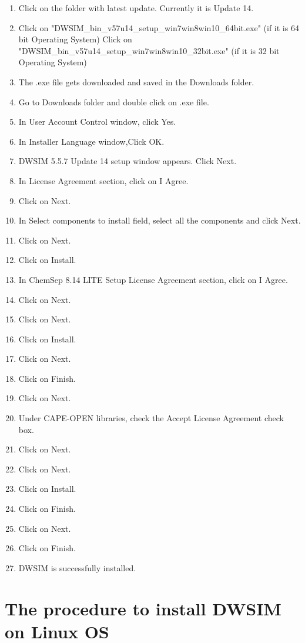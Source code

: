 \documentclass[12pt,a4paper]{article}
\begin{document}
\begin{enumerate}
\item Click on the folder with latest update. Currently it is Update 14.
\item Click on "DWSIM\_bin\_v57u14\_setup\_win7win8win10\_64bit.exe" (if it is 64 bit Operating System)
\newline Click on "DWSIM\_bin\_v57u14\_setup\_win7win8win10\_32bit.exe" (if it is 32 bit Operating System)
\item The .exe file gets downloaded and saved in the Downloads folder.
\item Go to Downloads folder and double click on .exe file.
\item In User Account Control window, click Yes.
\item In Installer Language window,Click OK.
\item DWSIM 5.5.7 Update 14 setup window appears. Click Next.
\item In License Agreement section, click on I Agree.
\item Click on Next.
\item In Select components to install field, select all the components and click Next.
\item Click on Next.
\item Click on Install.
\item In ChemSep 8.14 LITE Setup License Agreement section, click on I Agree.
\item Click on Next.
\item Click on Next.
\item Click on Install.
\item Click on Next.
\item Click on Finish.
\item Click on Next.
\item Under CAPE-OPEN libraries, check the Accept License Agreement check box.
\item Click on Next.
\item Click on Next.
\item Click on Install.
\item Click on Finish.
\item Click on Next.
\item Click on Finish.
\item DWSIM is successfully installed.

\end{enumerate}

\section{The procedure to install DWSIM on Linux OS}
\end{document}
